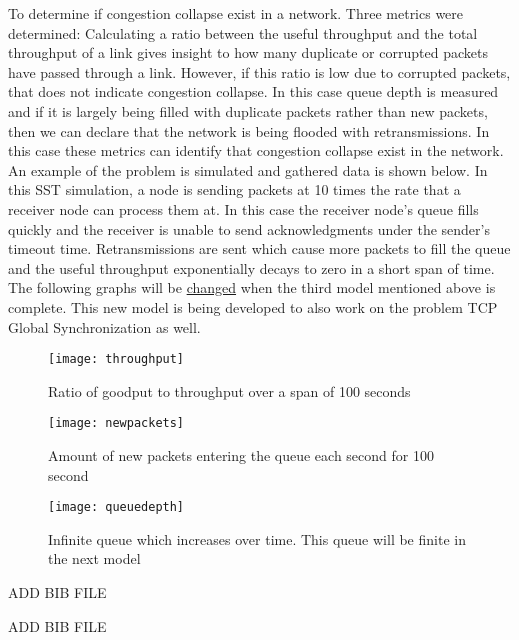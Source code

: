 \documentclass{article}
\begin{document}
To determine if congestion collapse exist in a network. Three metrics were determined:\newline
\indent Calculating a ratio between the useful throughput and the total throughput of a link gives insight to how many duplicate or corrupted packets have passed through a link. However, if this ratio is low due to corrupted packets, that does not indicate congestion collapse. In this case queue depth is measured and if it is largely being filled with duplicate packets rather than new packets, then we can declare that the network is being flooded with retransmissions. In this case these metrics can identify that congestion collapse exist in the network.\newline
\indent An example of the problem is simulated and gathered data is shown below. In this SST simulation, a node is sending packets at 10 times the rate that a receiver node can process them at. In this case the receiver node's queue fills quickly and the receiver is unable to send acknowledgments under the sender's timeout time. Retransmissions are sent which cause more packets to fill the queue and the useful throughput exponentially decays to zero in a short span of time. \newline\newline The following graphs will be \underline{changed} when the third model mentioned above is complete. This new model is being developed to also work on the problem TCP Global Synchronization as well. \newline

\begin{figure}[H]
\texttt{[image: throughput]}
\centering
\caption{Ratio of goodput to throughput over a span of 100 seconds}
\end{figure}

\begin{figure}[H]
	\texttt{[image: newpackets]}
	\centering
	\caption{Amount of new packets entering the queue each second for 100 second}
\end{figure}

\begin{figure}[H]
	\texttt{[image: queuedepth]}
	\centering
	\caption{Infinite queue which increases over time. This queue will be finite in the next model}
\end{figure}


\begin{thebibliography}{9}
ADD BIB FILE

ADD BIB FILE
\end{thebibliography}
\end{document}
